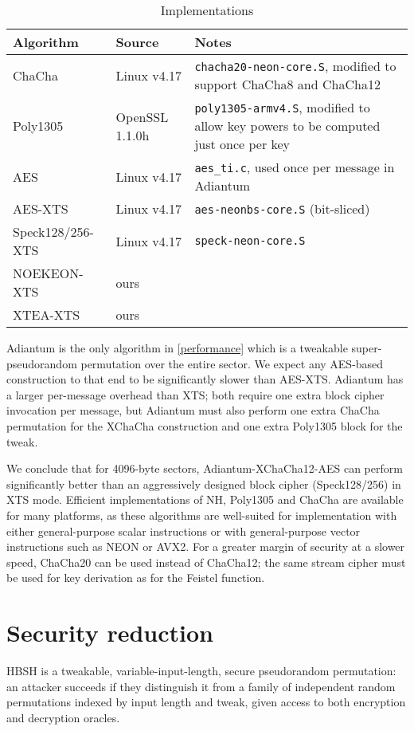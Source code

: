 \documentclass[journal=tosc,preprint,floatrow,submission]{iacrtrans}
\begin{document}
\begin{table}
    \caption{Implementations}
    \label{implementation}
    \centering
    \begin{tabular}{llp{7cm}}
        Algorithm & Source & Notes \\
    \hline
    ChaCha & Linux v4.17 & \texttt{chacha20-neon-core.S}, modified to support ChaCha8 and ChaCha12 \\
    Poly1305 & OpenSSL 1.1.0h & \texttt{poly1305-armv4.S}, modified to allow key
    powers to be computed just once per key \\
    \mbox{AES} & Linux v4.17 & \texttt{aes\_ti.c}, used once per message in Adiantum \\
    \mbox{AES-XTS} & Linux v4.17 & \texttt{aes-neonbs-core.S} (bit-sliced) \\
    \mbox{Speck128/256-XTS} & Linux v4.17 & \texttt{speck-neon-core.S} \\
    \mbox{NOEKEON-XTS} & ours & \\
    \mbox{XTEA-XTS} & ours & \\
    \end{tabular}
\end{table}

Adiantum is the only algorithm in \autoref{performance} which is a tweakable
super-pseudorandom permutation over the entire sector.  We expect any AES-based
construction to that end to be significantly slower than \mbox{AES-XTS}.
Adiantum has a larger per-message overhead than XTS; both require one
extra block cipher invocation per message, but Adiantum must also perform one extra
ChaCha permutation for the XChaCha construction and one extra Poly1305 block for the tweak.

We conclude that for 4096-byte sectors, \mbox{Adiantum-XChaCha12-AES} can perform
significantly better than an aggressively designed block cipher (\mbox{Speck128/256}) in XTS mode.
Efficient implementations of NH, Poly1305 and ChaCha are available for many
platforms, as these algorithms are well-suited for implementation with either
general-purpose scalar instructions or with general-purpose vector instructions
such as NEON or AVX2.
For a greater margin of security at a slower speed, ChaCha20 can
be used instead of ChaCha12; the same stream cipher
must be used for key derivation as for the Feistel function.

\section{Security reduction}
HBSH is a tweakable, variable-input-length, secure pseudorandom permutation: an attacker
succeeds if they distinguish it from a family of independent random permutations indexed by
input length and tweak, given access to both encryption and decryption oracles.
\end{document}
